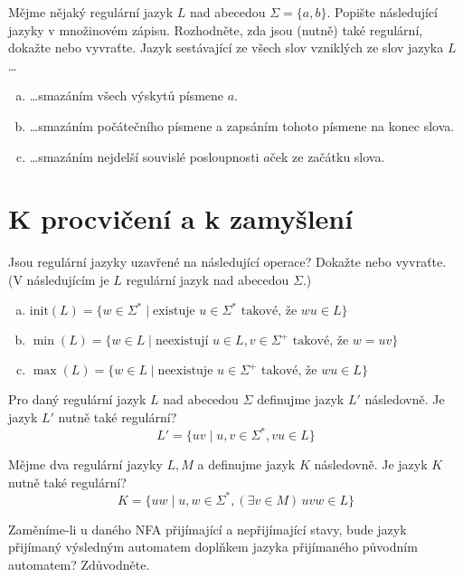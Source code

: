 \documentclass[a4paper,12pt]{amsart}
\begin{document}
\begin{problem}[Mazání]

    Mějme nějaký regulární jazyk $L$ nad abecedou $\Sigma=\{a,b\}$. Popište následující jazyky v množinovém zápisu. Rozhodněte, zda jsou (nutně) také regulární, dokažte nebo vyvraťte. Jazyk sestávající ze všech slov vzniklých ze slov jazyka $L$\dots
    
    \medskip
    \begin{enumerate}[(a)]\setlength\itemsep{12pt}
            \item \dots smazáním všech výskytů písmene $a$.
            \item \dots smazáním počátečního písmene a zapsáním tohoto písmene na konec slova.
            \item \dots smazáním nejdelší souvislé posloupnosti $a$ček ze začátku slova.
    \end{enumerate}

\end{problem}


\section*{K procvičení a k zamyšlení}


\medskip\medskip\begin{problem}[Prefixy]
    Jsou regulární jazyky uzavřené na následující operace? Dokažte nebo vyvraťte. (V následujícím je $L$ regulární jazyk nad abecedou $\Sigma$.)
    \begin{enumerate}[(a)]
        \item $\mathrm{init}(L)=\{w\in\Sigma^*\mid \text{existuje }u\in\Sigma^*\text{ takové, že }wu\in L\}$
        \item $\min(L)=\{w\in L\mid \text{neexistují }u\in L,v\in\Sigma^+\text{ takové, že }w=uv\}$
        \item $\max(L)=\{w\in L\mid \text{neexistuje }u\in\Sigma^+\text{ takové, že }wu\in L\}$
    \end{enumerate}
\end{problem}


\medskip\begin{problem}[Posun]
    Pro daný regulární jazyk $L$ nad abecedou $\Sigma$ definujme jazyk $L'$ následovně. Je jazyk $L'$ nutně také regulární?
    $$
    L'=\{uv\mid u,v\in\Sigma^*,vu\in L\}
    $$
\end{problem}


\medskip\begin{problem}[Řez]
    Mějme dva regulární jazyky $L,M$ a definujme jazyk $K$ následovně. Je jazyk $K$ nutně také regulární?
    $$
    K=\{uw\mid u,w\in\Sigma^*, (\exists v\in M)\, uvw\in L\}
    $$    
\end{problem}
    
\medskip\begin{problem}        
    Zaměníme-li u daného NFA přijímající a nepřijímající stavy, bude jazyk přijímaný výsledným automatem doplňkem jazyka přijímaného původním automatem? Zdůvodněte.        
\end{problem}
   
\end{document}
